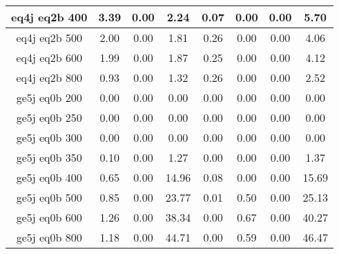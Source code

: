 \begin{longtable}{| c | c | c | c | c | c | c | c  | }
eq4j eq2b 400 & 3.39 & 0.00 & 2.24 & 0.07 & 0.00 & 0.00 & 5.70\\ \hline 
eq4j eq2b 500 & 2.00 & 0.00 & 1.81 & 0.26 & 0.00 & 0.00 & 4.06\\ \hline 
eq4j eq2b 600 & 1.99 & 0.00 & 1.87 & 0.25 & 0.00 & 0.00 & 4.12\\ \hline 
eq4j eq2b 800 & 0.93 & 0.00 & 1.32 & 0.26 & 0.00 & 0.00 & 2.52\\ \hline 
ge5j eq0b 200 & 0.00 & 0.00 & 0.00 & 0.00 & 0.00 & 0.00 & 0.00\\ \hline 
ge5j eq0b 250 & 0.00 & 0.00 & 0.00 & 0.00 & 0.00 & 0.00 & 0.00\\ \hline 
ge5j eq0b 300 & 0.00 & 0.00 & 0.00 & 0.00 & 0.00 & 0.00 & 0.00\\ \hline 
ge5j eq0b 350 & 0.10 & 0.00 & 1.27 & 0.00 & 0.00 & 0.00 & 1.37\\ \hline 
ge5j eq0b 400 & 0.65 & 0.00 & 14.96 & 0.08 & 0.00 & 0.00 & 15.69\\ \hline 
ge5j eq0b 500 & 0.85 & 0.00 & 23.77 & 0.01 & 0.50 & 0.00 & 25.13\\ \hline 
ge5j eq0b 600 & 1.26 & 0.00 & 38.34 & 0.00 & 0.67 & 0.00 & 40.27\\ \hline 
ge5j eq0b 800 & 1.18 & 0.00 & 44.71 & 0.00 & 0.59 & 0.00 & 46.47\\ \hline 
    \hline 
    \hline 
\end{longtable}
